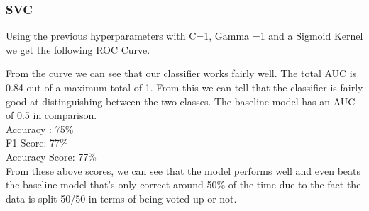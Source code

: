 \documentclass[11pt]{article} %
\begin{document}
\subsubsection{SVC}
Using the previous hyperparameters with C=1, Gamma =1 and a Sigmoid Kernel we get the following ROC Curve.
\begin{figure}[ht]
\centering
{}
\qquad
\end{figure}
From the curve we can see that our classifier works fairly well.  The total AUC is 0.84 out of a maximum total of 1.  From this we can tell that the classifier is fairly good at distinguishing between the two classes.  The baseline model has an AUC of 0.5 in comparison. 
\\Accuracy : 75\%
\\F1 Score: 77\%
\\Accuracy Score: 77\%
\\ From these above scores, we can see that the model performs well and even beats the baseline model that's only correct around 50\% of the time due to the fact the data is split 50/50 in terms of being voted up or not.
\end{document}

